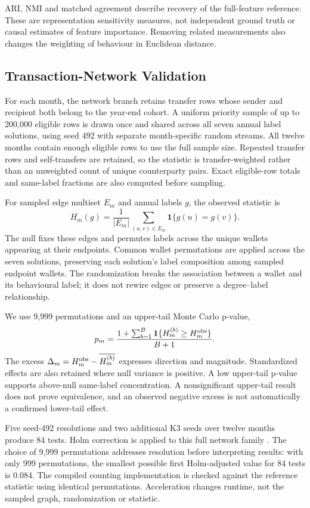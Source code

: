 ARI, NMI and matched agreement describe recovery of the full-feature reference. These are representation sensitivity measures, not independent ground truth or causal estimates of feature importance. Removing related measurements also changes the weighting of behaviour in Euclidean distance.

\subsection{Transaction-Network Validation}
For each month, the network branch retains transfer rows whose sender and recipient both belong to the year-end cohort. A uniform priority sample of up to 200,000 eligible rows is drawn once and shared across all seven annual label solutions, using seed 492 with separate month-specific random streams. All twelve months contain enough eligible rows to use the full sample size. Repeated transfer rows and self-transfers are retained, so the statistic is transfer-weighted rather than an unweighted count of unique counterparty pairs. Exact eligible-row totals and same-label fractions are also computed before sampling.

For sampled edge multiset $E_m$ and annual labels $g$, the observed statistic is
\begin{equation}
 H_m(g)=\frac{1}{|E_m|}\sum_{(u,v)\in E_m}\mathbf{1}\{g(u)=g(v)\}.
\end{equation}
The null fixes these edges and permutes labels across the unique wallets appearing at their endpoints. Common wallet permutations are applied across the seven solutions, preserving each solution's label composition among sampled endpoint wallets. The randomization breaks the association between a wallet and its behavioural label; it does not rewire edges or preserve a degree--label relationship.

We use 9,999 permutations and an upper-tail Monte Carlo p-value,
\begin{equation}
 p_m=\frac{1+\sum_{b=1}^{B}\mathbf{1}\{H_m^{(b)}\ge H_m^{\rm obs}\}}{B+1}.
\end{equation}
The excess $\Delta_m=H_m^{\rm obs}-\overline{H_m^{(b)}}$ expresses direction and magnitude. Standardized effects are also retained where null variance is positive. A low upper-tail p-value supports above-null same-label concentration. A nonsignificant upper-tail result does not prove equivalence, and an observed negative excess is not automatically a confirmed lower-tail effect.

Five seed-492 resolutions and two additional K3 seeds over twelve months produce 84 tests. Holm correction is applied to this full network family \cite{holm1979sequential}. The choice of 9,999 permutations addresses resolution before interpreting results: with only 999 permutations, the smallest possible first Holm-adjusted value for 84 tests is 0.084. The compiled counting implementation is checked against the reference statistic using identical permutations. Acceleration changes runtime, not the sampled graph, randomization or statistic.

